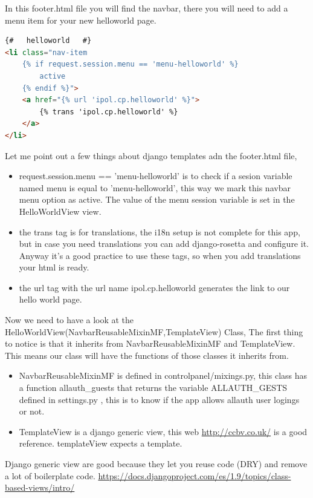 In this footer.html file you will find the navbar, there you will need to add a menu item for your new helloworld page.

\begin{lstlisting}[language=html,firstnumber=1]
{#   helloworld   #}
<li class="nav-item 
	{% if request.session.menu == 'menu-helloworld' %} 
		active 
	{% endif %}">
	<a href="{% url 'ipol.cp.helloworld' %}">
		{% trans 'ipol.cp.helloworld' %}
	</a>
</li>
\end{lstlisting}

Let me point out a few things about django templates adn the footer.html file, 

\begin{itemize}
\item  request.session.menu == 'menu-helloworld' is to check if a sesion variable named menu
is equal to  'menu-helloworld', this way we mark this navbar menu option as active.
The value of the menu session variable is set in the HelloWorldView view.

\item  the trans tag is for translations, the i18n setup is not complete for this app, but in case you need translations you can add django-rosetta and configure it.
Anyway it's a good practice to use these tags, so when you add translations your html is ready.

\item  the url tag with the url name ipol.cp.helloworld generates the link to our hello world page.

\end{itemize}

Now we need to have a look at the HelloWorldView(NavbarReusableMixinMF,TemplateView) Class,
The first thing to notice is that it inherits from NavbarReusableMixinMF and TemplateView.
This means our class will have the functions of those classes it inherits from.

\begin{itemize}
\item  NavbarReusableMixinMF is defined in controlpanel/mixings.py, this class has a function allauth\_guests that returns the variable ALLAUTH\_GESTS defined in settings.py , this is to know if the app allows allauth user logings or not.
\item  TemplateView is a django generic view, this web \url{http://ccbv.co.uk/} is a good reference. templateView expects a template.
\end{itemize}

Django generic view are good because they let you reuse code (DRY) and 
remove a lot of boilerplate code.
\url{https://docs.djangoproject.com/es/1.9/topics/class-based-views/intro/}

